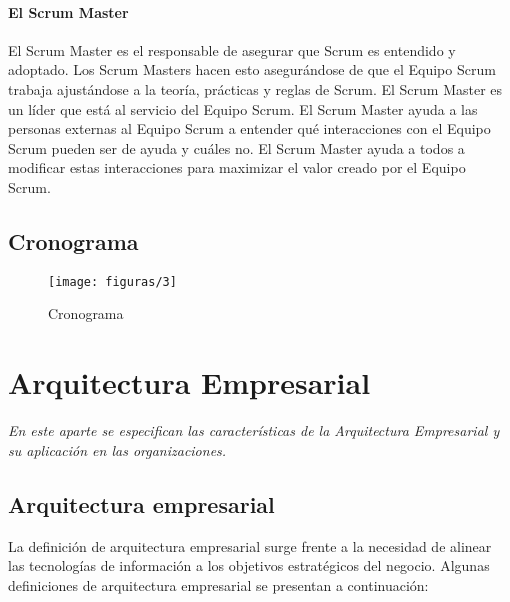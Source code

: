   \subsubsection{El Scrum Master}
  El Scrum Master es el responsable de asegurar que Scrum es entendido y adoptado. Los Scrum Masters hacen esto asegurándose de que el Equipo Scrum trabaja ajustándose a la teoría, prácticas y reglas de Scrum. El Scrum Master es un líder que está al servicio del Equipo Scrum. El Scrum Master ayuda a las personas externas al Equipo Scrum a entender qué interacciones con el Equipo Scrum pueden ser de ayuda y cuáles no. El Scrum Master ayuda a todos a modificar estas interacciones para maximizar el valor creado por el Equipo Scrum.

\section{Cronograma}
  \begin{figure}[H]
  	\centering
  	\texttt{[image: figuras/3]}
  	\captionsetup{width=.95\textwidth}
  	\caption{Cronograma}
  	\label{figura3}
  \end{figure}

\chapter{Arquitectura Empresarial}
\label{chap:aEmpresarial}
\textit{En este aparte se especifican  las características de la Arquitectura Empresarial y su aplicación en las organizaciones.}
\vfill
\minitoc
\newpage

\section{Arquitectura empresarial}
La definición de arquitectura empresarial surge frente a la necesidad de alinear las tecnologías de información a los objetivos estratégicos del negocio. \cite{ref1} Algunas definiciones de arquitectura empresarial se presentan a continuación:
  
